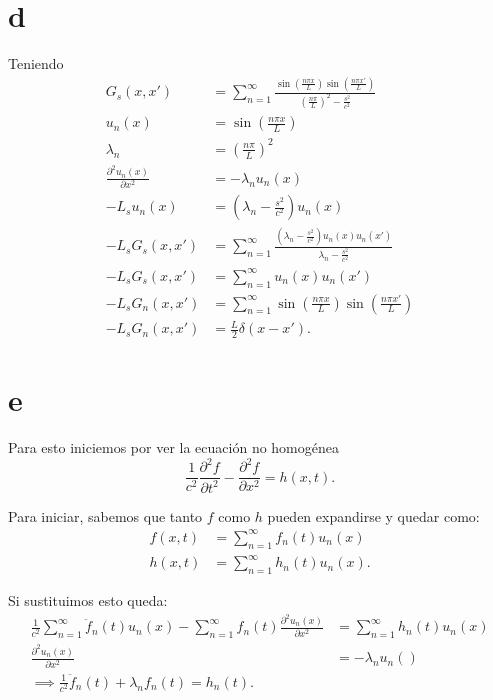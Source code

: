\documentclass{report}
\begin{document}
\section{d}

Teniendo
\begin{align*}
  G_s\left( x, x' \right) &= \sum_{n=1}^{\infty} \frac{\sin\left( \frac{n\pi x}{L} \right) \sin\left( \frac{n\pi x'}{L} \right) }{\left( \frac{n\pi}{L} \right)^2 - \frac{s^2}{c^2}}\\
  u_n\left( x \right) &= \sin\left( \frac{n\pi x}{L} \right)  \\
  \lambda_n &= \left( \frac{n\pi}{L} \right)^2 \\
  \frac{\partial^2 u_n\left( x \right) }{\partial x^2} &= -\lambda_n u_n\left( x \right)  \\
  -L_su_n\left( x \right) &= \left( \lambda_n - \frac{s^2}{c^2} \right) u_n\left( x \right)  \\
  -L_sG_s\left( x, x' \right) &= \sum_{n=1}^{\infty} \frac{\left( \lambda_n - \frac{s^2}{c^2} \right) u_n\left( x \right) u_n\left( x' \right) }{\lambda_n - \frac{s^2}{c^2}} \\
  -L_sG_s\left( x, x' \right) &= \sum_{n=1}^{\infty} u_n\left( x \right) u_n\left( x' \right)  \\
  -L_sG_n\left( x, x' \right) &= \sum_{n=1}^{\infty} \sin\left( \frac{n\pi x}{L} \right) \sin\left( \frac{n\pi x'}{L} \right)  \\
  -L_sG_n\left( x, x' \right) &= \frac{L}{2}\delta\left( x - x' \right)
.\end{align*}

\section{e}

Para esto iniciemos por ver la ecuación no homogénea \[
\frac{1}{c^2}\frac{\partial^2 f}{\partial t^2} - \frac{\partial^2 f}{\partial x^2} = h\left( x, t \right) 
.\] 

Para iniciar, sabemos que tanto $f$ como $h$ pueden expandirse y quedar como:
\begin{align*}
  f\left( x, t \right) &= \sum_{n=1}^{\infty} f_n\left( t \right) u_n\left( x \right)  \\
  h\left( x, t \right) &= \sum_{n=1}^{\infty} h_n\left( t \right) u_n\left( x \right) 
.\end{align*}

Si sustituimos esto queda:
\begin{align*}
  \frac{1}{c^2}\sum_{n=1}^{\infty} \ddot{f}_n\left( t \right) u_n\left( x \right) - \sum_{n=1}^{\infty} f_n\left( t \right) \frac{\partial^2 u_n\left( x \right) }{\partial x^2} &= \sum_{n=1}^{\infty} h_n\left( t \right) u_n\left( x \right)  \\
  \frac{\partial^2 u_n\left( x \right) }{\partial x^2} &= -\lambda_n u_n\left(  \right)  \\
  \implies \frac{1}{c^2}\ddot{f}_n\left( t \right) + \lambda_n f_n\left( t \right) = h_n\left( t \right) 
.\end{align*}
\end{document}
